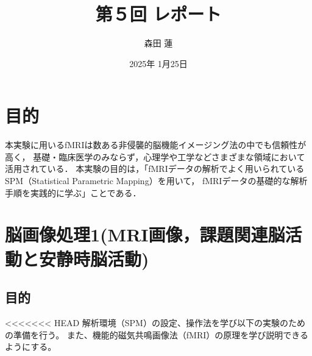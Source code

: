 \documentclass{jlreq}
\title{第５回 レポート}
\author{森田 蓮}
\date{2025年 1月25日}
\begin{document}
\maketitle

\section{目的}
本実験に用いるfMRIは数ある非侵襲的脳機能イメージング法の中でも信頼性が高く，
基礎・臨床医学のみならず，心理学や工学などさまざまな領域において活用されている．
本実験の目的は，「fMRIデータの解析でよく用いられているSPM（Statistical Parametric Mapping）を用いて，
fMRIデータの基礎的な解析手順を実践的に学ぶ」ことである．

\section{脳画像処理1(MRI画像，課題関連脳活動と安静時脳活動)}
\subsection{目的}
<<<<<<< HEAD
解析環境（SPM）の設定、操作法を学び以下の実験のための準備を行う。
また、機能的磁気共鳴画像法（fMRI）の原理を学び説明できるようにする。
\end{document}
